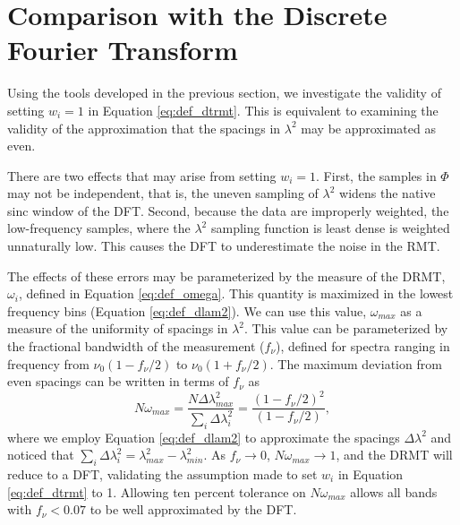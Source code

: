 \section{Comparison with the Discrete Fourier Transform}

Using the tools developed in the previous section, we investigate the validity of setting $w_i=1$ in
Equation \ref{eq:def_dtrmt}. This is equivalent to examining the validity of the approximation that
the spacings in $\lambda^2$ may be approximated as even.

There are two effects that may arise from setting $w_i=1$. First, the samples in $\Phi$ may not be
independent, that is, the uneven sampling of $\lambda^2$ widens the native sinc window of the DFT.
Second, because the data are improperly weighted, the low-frequency samples, where the $\lambda^2$
sampling function is least dense is weighted unnaturally low. This causes the DFT to underestimate
the noise in the RMT.

The effects of these errors may be parameterized by the measure of the DRMT, $\omega_i$, defined in
Equation \ref{eq:def_omega}. This quantity is maximized in the lowest frequency bins (Equation
\ref{eq:def_dlam2}). We can use this value, $\omega_{max}$ as a measure of the uniformity of
spacings in $\lambda^2$. This value can be parameterized by the fractional bandwidth of the 
measurement ($f_\nu$), defined for spectra ranging in
frequency from $\nu_0(1-f_\nu/2)$ to $\nu_0(1+f_\nu/2)$. The maximum deviation from even spacings
can be written in terms of $f_\nu$ as
\begin{equation}
  N\omega_{max} = \frac{N\Delta\lambda^2_{max}}{\sum_i\Delta\lambda^2_i}
    = \frac{(1-f_\nu/2)^2}{(1-f_\nu/2)},
\end{equation}
where we employ Equation \ref{eq:def_dlam2} to approximate the spacings $\Delta\lambda^2$ and
noticed that $\sum_i\Delta\lambda^2_i = \lambda_{max}^2 - \lambda_{min}^2$. As $f_\nu\to0$,
$N\omega_{max}\to 1$, and the DRMT will reduce to a DFT, validating the assumption made to set
$w_i$ in Equation \ref{eq:def_dtrmt} to 1. Allowing ten percent tolerance on $N\omega_{max}$ allows
all bands with $f_\nu < 0.07$ to be well approximated by the DFT.


